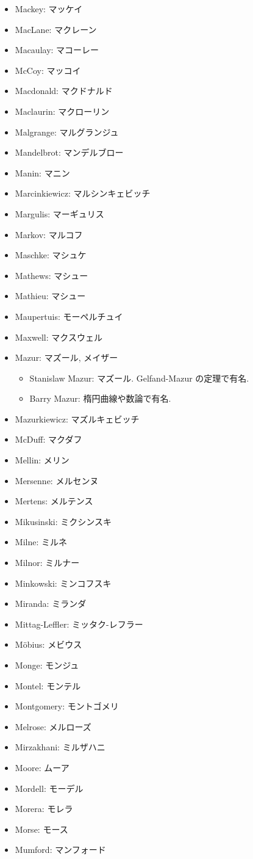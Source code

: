 \documentclass[openany, a4paper, oneside]{jsbook}
\begin{document}
\begin{itemize}
\item Mackey: マッケイ
\item MacLane: マクレーン
\item Macaulay: マコーレー
\item McCoy: マッコイ
\item Macdonald: マクドナルド
\item Maclaurin: マクローリン
\item Malgrange: マルグランジュ
\item Mandelbrot: マンデルブロー
\item Manin: マニン
\item Marcinkiewicz: マルシンキェビッチ
\item Margulis: マーギュリス
\item Markov: マルコフ
\item Maschke: マシュケ
\item Mathews: マシュー
\item Mathieu: マシュー
\item Maupertuis: モーペルチュイ
\item Maxwell: マクスウェル
\item Mazur: マズール, メイザー
\begin{itemize}
\item Stanislaw Mazur: マズール. Gelfand-Mazur の定理で有名.
\item Barry Mazur: 楕円曲線や数論で有名.
\end{itemize}
\item Mazurkiewicz: マズルキェビッチ
\item McDuff: マクダフ
\item Mellin: メリン
\item Mersenne: メルセンヌ
\item Mertens: メルテンス
\item Mikusinski: ミクシンスキ
\item Milne: ミルネ
\item Milnor: ミルナー
\item Minkowski: ミンコフスキ
\item Miranda: ミランダ
\item Mittag-Leffler: ミッタク-レフラー
\item M\"obius: メビウス
\item Monge: モンジュ
\item Montel: モンテル
\item Montgomery: モントゴメリ
\item Melrose: メルローズ
\item Mirzakhani: ミルザハニ
\item Moore: ムーア
\item Mordell: モーデル
\item Morera: モレラ
\item Morse: モース
\item Mumford: マンフォード
\end{itemize}
\end{document}
